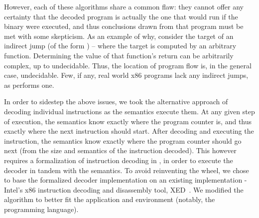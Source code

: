 However, each of these algorithms share a common flaw: they cannot offer any certainty that the decoded program is actually the one that would run if the binary were executed, and thus conclusions drawn from that program must be met with some skepticism.  As an example of why, consider the target of an indirect jump (of the form ) – where the target is computed by an arbitrary function.  Determining the value of that function’s return can be arbitrarily complex, up to undecidable.  Thus, the location of program flow is, in the general case, undecidable.  Few, if any, real world x86 programs lack any indirect jumps, as  performs one. 

In order to sidestep the above issues, we took the alternative approach of decoding individual instructions as the semantics execute them.  At any given step of execution, the semantics know exactly where the program counter is, and thus exactly where the next instruction should start.  After decoding and executing the instruction, the semantics know exactly where the program counter should go next (from the size and semantics of the instruction decoded).  This however requires a formalization of instruction decoding in \K, in order to execute the decoder in tandem with the semantics.  To avoid reinventing the wheel, we chose to base the formalized decoder implementation on an existing implementation - Intel’s x86 instruction decoding and disassembly tool, XED~\cite{xed}.  We modified the algorithm to better fit the application and environment (notably, the \K programming language). 

